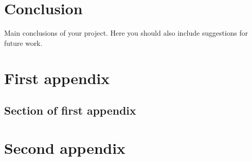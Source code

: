 \documentclass{mproj}
\begin{document}
\chapter{Conclusion}\label{conclusion}

Main conclusions of your project. Here you should also include suggestions for future work.

\appendix %
\chapter{First appendix}

\section{Section of first appendix}

\chapter{Second appendix}



\end{document}
